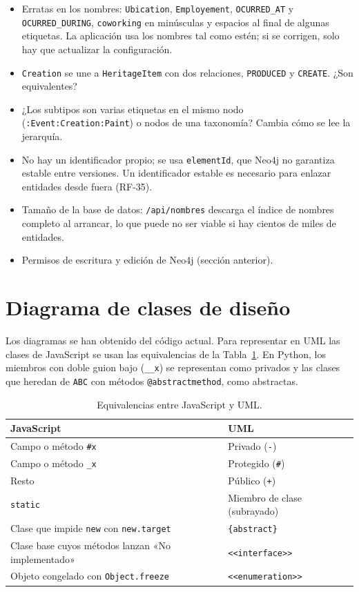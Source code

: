 \begin{itemize}
  \item Erratas en los nombres: \texttt{Ubication}, \texttt{Employement}, \texttt{OCURRED\_AT} y \texttt{OCURRED\_DURING}, \texttt{coworking} en minúsculas y espacios al final de algunas etiquetas. La aplicación usa los nombres tal como estén; si se corrigen, solo hay que actualizar la configuración.
  \item \texttt{Creation} se une a \texttt{HeritageItem} con dos relaciones, \texttt{PRODUCED} y \texttt{CREATE}. ¿Son equivalentes?
  \item ¿Los subtipos son varias etiquetas en el mismo nodo (\texttt{:Event:Creation:Paint}) o nodos de una taxonomía? Cambia cómo se lee la jerarquía.
  \item No hay un identificador propio; se usa \texttt{elementId}, que Neo4j no garantiza estable entre versiones. Un identificador estable es necesario para enlazar entidades desde fuera (RF-35).
  \item Tamaño de la base de datos: \texttt{/api/nombres} descarga el índice de nombres completo al arrancar, lo que puede no ser viable si hay cientos de miles de entidades.
  \item Permisos de escritura y edición de Neo4j (sección anterior).
\end{itemize}

\section{Diagrama de clases de diseño}
\label{sec:clases}

Los diagramas se han obtenido del código actual. Para representar en UML las clases de JavaScript se usan las equivalencias de la Tabla~\ref{tab:equivalencias}. En Python, los miembros con doble guion bajo (\texttt{\_\_x}) se representan como privados y las clases que heredan de \texttt{ABC} con métodos \texttt{@abstractmethod}, como abstractas.

\begin{table}[htbp]
\centering
\small
\caption{Equivalencias entre JavaScript y UML.}
\label{tab:equivalencias}
\begin{tabular}{|p{}|p{}|}
\hline
\textbf{JavaScript} & \textbf{UML} \\ \hline
Campo o método \texttt{\#x} & Privado (\texttt{-}) \\ \hline
Campo o método \texttt{\_x} & Protegido (\texttt{\#}) \\ \hline
Resto & Público (\texttt{+}) \\ \hline
\texttt{static} & Miembro de clase (subrayado) \\ \hline
Clase que impide \texttt{new} con \texttt{new.target} & \texttt{\{abstract\}} \\ \hline
Clase base cuyos métodos lanzan «No implementado» & \texttt{<<interface>>} \\ \hline
Objeto congelado con \texttt{Object.freeze} & \texttt{<<enumeration>>} \\ \hline
\end{tabular}
\end{table}

